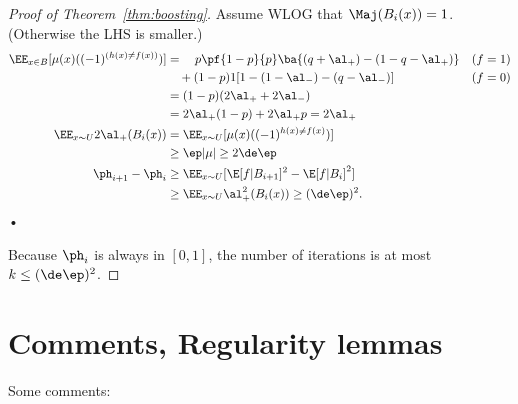 \begin{proof}[Proof of Theorem~\ref{thm:boosting}]

Assume WLOG that $\Maj(B_i(x))=1$.  (Otherwise the LHS is smaller.)
\begin{align}
\EE_{x\in B}[\mu(x) ((-1)^{(h(x)\ne f(x))})]
&=\quad p\pf{1-p}{p} \ba{(q+\al_+) - (1-q-\al_+)}&(f=1)\\
&\quad +(1-p) 1 [1-(1-\al_-) - (q-\al_-)]&(f=0)\\
&=(1-p) (2\al_++2\al_-)\\
&= 2\al_+(1-p) + 2\al_+p=2\al_+\\
\EE_{x\sim U} 2\al_+(B_i(x)) 
&=\EE_{x\sim U} [\mu(x) ((-1)^{h(x)\ne f(x)})]\\
&\ge \ep|\mu| \ge 2\de \ep\\
\ph_{i+1}-\ph_i &\ge 
\EE_{x\sim U} [\E[f|B_{i+1}]^2 - \E[f|B_i]^2]\\
&\ge 
\EE_{x\sim U} \al_+^2(B_i(x))\ge  (\de\ep)^2.
\end{align}•

Because $\ph_i$ is always in $[0,1]$, the number of iterations is at most $k\le (\de \ep)^2$.
\end{proof}

\section{Comments, Regularity lemmas}

Some comments:

